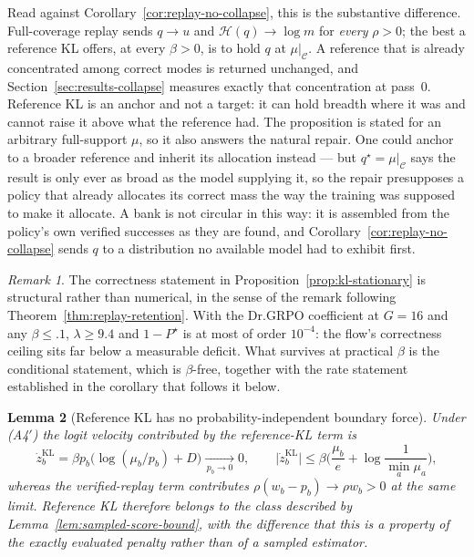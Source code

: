 \documentclass{article}
\newcommand{\1}{\mathbf 1}
\newtheorem{lemma}{Lemma}[section]
\theoremstyle{remark}
\newtheorem{remark}[lemma]{Remark}
\theoremstyle{definition}
\theoremstyle{plain}
\begin{document}
Read against Corollary~\ref{cor:replay-no-collapse}, this is the substantive
difference. Full-coverage replay sends $q\to u$ and
$\mathcal H(q)\to\log m$ for \emph{every} $\rho>0$; the best a reference KL
offers, at every $\beta>0$, is to hold $q$ at $\mu|_{\mathcal C}$. A reference that is already
concentrated among correct modes is returned unchanged, and
Section~\ref{sec:results-collapse} measures exactly that concentration at pass~0.
Reference KL is an anchor and not a target: it can hold breadth where it was
and cannot raise it above what the reference had. The proposition is stated for
an arbitrary full-support $\mu$, so it also answers the natural repair. One
could anchor to a broader reference and inherit its allocation instead --- but
$q^\star=\mu|_{\mathcal C}$ says the result is only ever as broad as the model
supplying it, so the repair presupposes a policy that already allocates its
correct mass the way the training was supposed to make it allocate. A bank is
not circular in this way: it is assembled from the policy's own verified
successes as they are found, and Corollary~\ref{cor:replay-no-collapse} sends
$q$ to a distribution no available model had to exhibit first.

\begin{remark}
The correctness statement in Proposition~\ref{prop:kl-stationary} is structural
rather than numerical, in the sense of the remark following
Theorem~\ref{thm:replay-retention}. With the Dr.GRPO coefficient at $G=16$ and
any $\beta\le.1$, $\lambda\ge9.4$ and $1-P^\star$ is at most of order
$10^{-4}$: the flow's correctness ceiling sits far below a measurable deficit.
What survives at practical $\beta$ is the conditional statement, which is
$\beta$-free, together with the rate statement established in the corollary
that follows it below.
\end{remark}

\begin{lemma}[Reference KL has no probability-independent boundary force]
\label{lem:kl-boundary-force}
Under (A4$'$) the logit velocity contributed by the reference-KL term is
\[
  \dot z^{\mathrm{KL}}_b=\beta p_b\big(\log(\mu_b/p_b)+D\big)
  \xrightarrow[\,p_b\to0\,]{}0,
  \qquad
  \big|\dot z^{\mathrm{KL}}_b\big|
  \le\beta\Big(\frac{\mu_b}{e}+\log\frac1{\min_a\mu_a}\Big),
\]
whereas the verified-replay term contributes $\rho(w_b-p_b)\to\rho w_b>0$ at
the same limit. Reference KL therefore belongs to the class described by
Lemma~\ref{lem:sampled-score-bound}, with the difference that this is a
property of the exactly evaluated penalty rather than of a sampled estimator.
\end{lemma}
\end{document}
